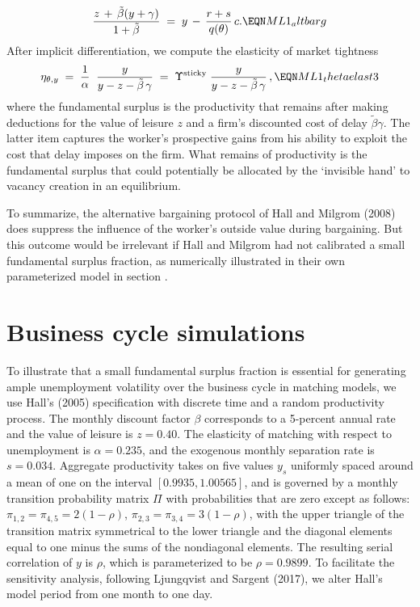 $$
{ z\,+\,\tilde \beta(y+\gamma) \over 1+\tilde \beta }  \;=\;
y \,-\, {r + s \over q(\theta)} \, c .       \EQN ML1_altbarg
$$
After implicit differentiation,
we compute the elasticity of market tightness 
$$
\eta_{\theta,y}
\;=\; {1 \over \alpha} \; \;
      {y \over y-z- \tilde \beta \,\gamma}
\;=\; \Upsilon^{\rm sticky}\;
         {y \over y-z- \tilde \beta \,\gamma}\,,  \EQN ML1_thetaelast3
$$
where the fundamental surplus is the productivity
that remains after making deductions for the value of leisure $z$
and a firm's discounted cost of delay $\tilde \beta \gamma$.
The latter item
captures the worker's prospective gains from his
 ability to exploit the
cost that delay imposes on the firm.  What remains of productivity is the
fundamental surplus that could potentially be allocated by the
`invisible hand'  to  vacancy creation in an equilibrium.

To summarize, the alternative bargaining
protocol of Hall and Milgrom (2008) does suppress the influence of the
worker's outside value during bargaining. But
this outcome would be irrelevant if  Hall and Milgrom had  not
calibrated a small fundamental surplus fraction, as numerically
illustrated in their own parameterized model in section
.







\section{Business cycle simulations}\label{sec:FS_simulations}%
%
To illustrate that a small fundamental surplus fraction is essential for
generating ample unemployment volatility over the business cycle in
matching models, we use  Hall's (2005) specification
with discrete time and a  random productivity process.
The monthly discount factor $\beta$ corresponds to a 5-percent annual
rate and the value of leisure is $z=0.40$. The elasticity of
matching with respect to unemployment is $\alpha=0.235$, and the
exogenous monthly separation rate is $s=0.034$. Aggregate productivity
takes on five  values $y_s$ uniformly spaced around a mean of
one on the interval $[0.9935, 1.00565]$, and is governed by
a monthly transition probability matrix $\Pi$ with probabilities
that are zero except as follows: $\pi_{1,2}=\pi_{4,5}=2(1-\rho)$,
$\pi_{2,3}=\pi_{3,4}=3(1-\rho)$, with the upper triangle of the
transition matrix symmetrical to the lower triangle and the
diagonal elements equal to one minus the sums of the nondiagonal
elements. The resulting serial correlation of $y$ is $\rho$, which
is parameterized to be $\rho=0.9899$.
To facilitate the
sensitivity analysis, following Ljungqvist and Sargent (2017), we alter
Hall's model period from one month to one day.




